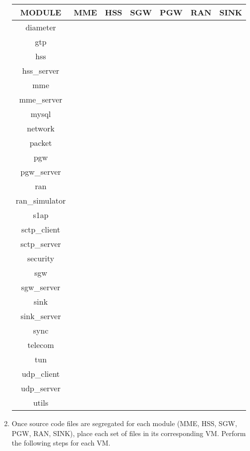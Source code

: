 \documentclass[hidelinks]{report}
\newcommand{\T} {
	\checkmark
}
\begin{document}
\begin{enumerate}
\begin{table}[H]
\begin{tabular}{|c|c|c|c|c|c|c|}
\hline
\textbf{MODULE} & \textbf{MME} & \textbf{HSS} & \textbf{SGW} & \textbf{PGW} & \textbf{RAN} & \textbf{SINK} \\
\hline
diameter & \T & \T & \T & \T & \T & \T \\
gtp & \T & \T & \T & \T & \T & \T \\
hss & & \T & & & & \\
hss\_server & & \T & & & & \\
mme & \T & & & & & \\
mme\_server & \T & & & & & \\
mysql & & \T & & & & \\
network & \T & \T & \T & \T & \T & \T \\
packet & \T & \T & \T & \T & \T & \T \\
pgw & & & & \T & & \\
pgw\_server & & & & \T & & \\
ran & & & & & \T & \\
ran\_simulator & & & & & \T & \\
s1ap & \T & \T & \T & \T & \T & \T \\
sctp\_client & \T & & & & \T & \\
sctp\_server & \T & \T & & & & \\
security & \T & & & & \T & \\
sgw & & & \T & & & \\
sgw\_server & & & \T & & & \\
sink & & & & & & \T \\
sink\_server & & & & & & \T \\
sync & \T & \T & \T & \T & \T & \\
telecom & \T & & & & \T & \\
tun & & & & & \T & \T \\
udp\_client & \T & & \T & \T & \T & \T \\
udp\_server & & & \T & \T & \T & \T \\
utils & \T & \T & \T & \T & \T & \T \\
\hline

\end{tabular}

\end{table}

\item Once source code files are segregated for each module (MME, HSS, SGW, PGW, RAN, SINK), place each set of files in its corresponding VM. Perform the following steps for each VM.

\begin{enumerate}


\end{enumerate}
\end{enumerate}
\end{document}
